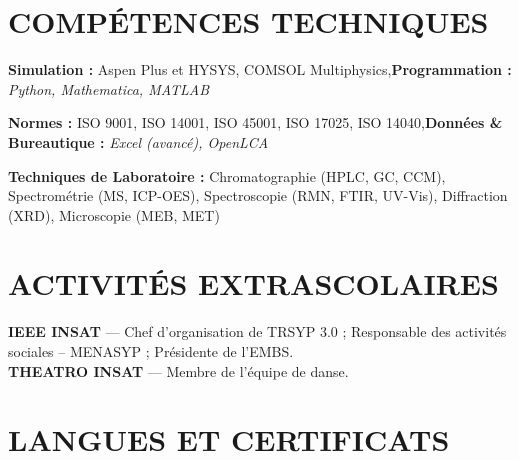 \documentclass[10pt]{article}
\begin{document}
\section{COMPÉTENCES TECHNIQUES}
\begin{bul}
\item \textbf{Simulation :} Aspen Plus et HYSYS, COMSOL Multiphysics\sep\textbf{Programmation :} \textit{Python, Mathematica, MATLAB}
\item \textbf{Normes :} ISO 9001, ISO 14001, ISO 45001, ISO 17025, ISO 14040\sep\textbf{Données \& Bureautique :} \textit{Excel (avancé), OpenLCA}
\item \textbf{Techniques de Laboratoire :} Chromatographie (HPLC, GC, CCM), Spectrométrie (MS, ICP-OES), Spectroscopie (RMN, FTIR, UV-Vis), Diffraction (XRD), Microscopie (MEB, MET)
\end{bul}

\section{ACTIVITÉS EXTRASCOLAIRES}
{\textbf{IEEE INSAT} — Chef d'organisation de TRSYP 3.0 ; Responsable des activités sociales – MENASYP ; Présidente de l'EMBS.\\
\textbf{THEATRO INSAT} — Membre de l'équipe de danse.\par}

\section{LANGUES ET CERTIFICATS}
\end{document}
